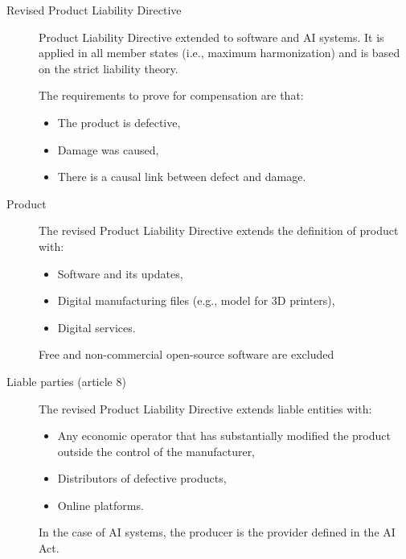 \begin{description}
    \item[Revised Product Liability Directive] 
        Product Liability Directive extended to software and AI systems. It is applied in all member states (i.e., maximum harmonization) and is based on the strict liability theory.

        The requirements to prove for compensation are that:
        \begin{itemize}
            \item The product is defective,
            \item Damage was caused,
            \item There is a causal link between defect and damage.
        \end{itemize}

    \item[Product] 
        The revised Product Liability Directive extends the definition of product with:
        \begin{itemize}
            \item Software and its updates,
            \item Digital manufacturing files (e.g., model for 3D printers),
            \item Digital services.
        \end{itemize}

        \begin{remark}
            Free and non-commercial open-source software are excluded
        \end{remark}

    \item[Liable parties (article 8)] 
        The revised Product Liability Directive extends liable entities with:
        \begin{itemize}
            \item Any economic operator that has substantially modified the product outside the control of the manufacturer,
            \item Distributors of defective products,
            \item Online platforms.
        \end{itemize}
    
        \begin{remark}
            In the case of AI systems, the producer is the provider defined in the AI Act.
        \end{remark}


\end{description}
